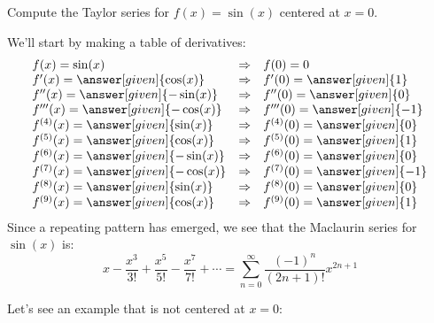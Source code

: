 \documentclass{ximera}
\begin{document}
\begin{example}
  Compute the Taylor series for $f(x) = \sin(x)$ centered at $x=0$.
  \begin{explanation}
    We'll start by making a table of derivatives:
    \[
    \begin{array}{lcl}
      f(x) = \sin(x) & \Rightarrow &f(0) = 0\\
      f'(x) = \answer[given]{\cos(x)} & \Rightarrow & f'(0) = \answer[given]{1}\\
      f''(x) = \answer[given]{-\sin(x)} &\Rightarrow &f''(0) = \answer[given]{0}\\
      f'''(x) = \answer[given]{-\cos(x)} &\Rightarrow &f'''(0) = \answer[given]{-1}\\
      f^{(4)}(x) = \answer[given]{\sin(x)} &\Rightarrow &f^{(4)}(0) = \answer[given]{0}\\
      f^{(5)}(x) = \answer[given]{\cos(x)} &\Rightarrow &f^{(5)}(0) = \answer[given]{1}\\
      f^{(6)}(x) = \answer[given]{-\sin(x)} &\Rightarrow &f^{(6)}(0) =\answer[given]{0}\\
      f^{(7)}(x) = \answer[given]{-\cos(x)} &\Rightarrow &f^{(7)}(0) = \answer[given]{-1}\\
      f^{(8)}(x) = \answer[given]{\sin(x)} &\Rightarrow &f^{(8)}(0) = \answer[given]{0}\\
      f^{(9)}(x) = \answer[given]{\cos(x)} &\Rightarrow &f^{(9)}(0) = \answer[given]{1}\\
    \end{array}
    \]
    Since a repeating pattern has emerged, we see that the Maclaurin
    series for $\sin(x)$ is:
    \[
    x-\frac{x^3}{3!}+\frac{x^5}{5!}-\frac{x^7}{7!}+\cdots = \sum_{n=0}^\infty \frac{(-1)^{n}}{(2n+1)!} x^{2n+1}
    \]
  \end{explanation}
\end{example}


Let's see an example that is not centered at $x=0$:
\end{document}
